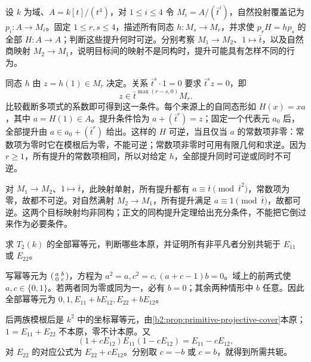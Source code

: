 \begin{exercise}\label{b2:ex:15-lifting-between-covers}
	设 \(k\) 为域、\(A=k[t]/(t^4)\)，对 \(1\le i\le4\) 令 \(M_i=A/(\bar t^i)\)，自然投射覆盖记为 \(p_i:A\to M_i\)。固定 \(1\le r,s\le4\)，描述所有同态 \(h:M_s\to M_r\)，并求使 \(p_rH=hp_s\) 的全部 \(H:A\to A\)；判断这些提升何时可逆。分别考察 \(M_1\to M_2\)、\(1\mapsto\bar t\)，以及自然商映射 \(M_2\to M_1\)，说明目标间的映射不是同构时，提升可能具有怎样不同的行为。
\end{exercise}
\begin{solution}
	同态 \(h\) 由 \(z=h(1)\in M_r\) 决定。关系 \(\bar t^s\cdot1=0\) 要求 \(\bar t^sz=0\)，即
	\[
		z\in\bar t^{\max(r-s,0)}M_r.
	\]
	比较截断多项式的系数即可得到这一条件。每个来源上的自同态形如 \(H(x)=xa\)，其中 \(a=H(1)\in A\)。提升条件恰为 \(a+(\bar t^r)=z\)；固定一个代表元 \(a_0\) 后，全部提升由 \(a\in a_0+(\bar t^r)\) 给出。这样的 \(H\) 可逆，当且仅当 \(a\) 的常数项非零：常数项为零时它在模根后为零，不能可逆；常数项非零时可用有限几何和求逆。因为 \(r\ge1\)，所有提升的常数项相同，所以对给定 \(h\)，全部提升同时可逆或同时不可逆。

	对 \(M_1\to M_2\)、\(1\mapsto\bar t\)，此映射单射，所有提升都有 \(a\equiv\bar t\pmod{\bar t^2}\)，常数项为零，故都不可逆。对自然满射 \(M_2\to M_1\)，所有提升满足 \(a\equiv1\pmod{\bar t}\)，故都可逆。这两个目标映射均非同构；正文的同构提升定理给出充分条件，不能把它倒过来作为必要条件。
\end{solution}

\begin{exercise}\label{b2:ex:15-triangular-idempotents}
	求 \(T_2(k)\) 的全部幂等元，判断哪些本原，并证明所有非平凡者分别共轭于 \(E_{11}\) 或 \(E_{22}\)。
\end{exercise}
\begin{solution}
	写幂等元为 \(\begin{psmallmatrix}a&b\\0&c\end{psmallmatrix}\)，方程为 \(a^2=a,c^2=c,(a+c-1)b=0\)。域上的前两式使 \(a,c\in\{0,1\}\)。若两者同为零或同为一，必有 \(b=0\)；其余两种情形中 \(b\) 任意。因此全部幂等元为 \(0,1,E_{11}+bE_{12},E_{22}+bE_{12}\)。

	后两族模根后是 \(k^2\) 中的坐标幂等元，由\cref{b2:prop:primitive-projective-cover}本原；\(1=E_{11}+E_{22}\) 不本原，零不计本原。又
	\[
		(1+cE_{12})E_{11}(1-cE_{12})=E_{11}-cE_{12},
	\]
	对 \(E_{22}\) 的对应公式为 \(E_{22}+cE_{12}\)。分别取 \(c=-b\) 或 \(c=b\)，就得到所需共轭。
\end{solution}

